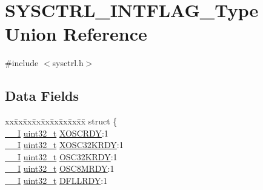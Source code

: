 \hypertarget{union_s_y_s_c_t_r_l___i_n_t_f_l_a_g___type}{}\section{S\+Y\+S\+C\+T\+R\+L\+\_\+\+I\+N\+T\+F\+L\+A\+G\+\_\+\+Type Union Reference}
\label{union_s_y_s_c_t_r_l___i_n_t_f_l_a_g___type}


{\ttfamily \#include $<$sysctrl.\+h$>$}

\subsection*{Data Fields}
\begin{DoxyCompactItemize}
\item 
\begin{tabbing}
xx\=xx\=xx\=xx\=xx\=xx\=xx\=xx\=xx\=\kill
struct \{\\
\>\mbox{\hyperlink{core__cm0plus_8h_af63697ed9952cc71e1225efe205f6cd3}{\_\_I}} \mbox{\hyperlink{union_s_y_s_c_t_r_l___i_n_t_f_l_a_g___type_a7c2ec0f7b3f1314bdede58b182af397c}{uint32\_t}} \mbox{\hyperlink{union_s_y_s_c_t_r_l___i_n_t_f_l_a_g___type_a9aa97074ed30a2f0ac649d8528d5d678}{XOSCRDY}}:1\\
\>\mbox{\hyperlink{core__cm0plus_8h_af63697ed9952cc71e1225efe205f6cd3}{\_\_I}} \mbox{\hyperlink{union_s_y_s_c_t_r_l___i_n_t_f_l_a_g___type_a7c2ec0f7b3f1314bdede58b182af397c}{uint32\_t}} \mbox{\hyperlink{union_s_y_s_c_t_r_l___i_n_t_f_l_a_g___type_ae11e5e790a7928746b574e5f9538107f}{XOSC32KRDY}}:1\\
\>\mbox{\hyperlink{core__cm0plus_8h_af63697ed9952cc71e1225efe205f6cd3}{\_\_I}} \mbox{\hyperlink{union_s_y_s_c_t_r_l___i_n_t_f_l_a_g___type_a7c2ec0f7b3f1314bdede58b182af397c}{uint32\_t}} \mbox{\hyperlink{union_s_y_s_c_t_r_l___i_n_t_f_l_a_g___type_a2b786573344459935e68c9aeb80142eb}{OSC32KRDY}}:1\\
\>\mbox{\hyperlink{core__cm0plus_8h_af63697ed9952cc71e1225efe205f6cd3}{\_\_I}} \mbox{\hyperlink{union_s_y_s_c_t_r_l___i_n_t_f_l_a_g___type_a7c2ec0f7b3f1314bdede58b182af397c}{uint32\_t}} \mbox{\hyperlink{union_s_y_s_c_t_r_l___i_n_t_f_l_a_g___type_a74f2eac2773310fa93ba3ccc030032a6}{OSC8MRDY}}:1\\
\>\mbox{\hyperlink{core__cm0plus_8h_af63697ed9952cc71e1225efe205f6cd3}{\_\_I}} \mbox{\hyperlink{union_s_y_s_c_t_r_l___i_n_t_f_l_a_g___type_a7c2ec0f7b3f1314bdede58b182af397c}{uint32\_t}} \mbox{\hyperlink{union_s_y_s_c_t_r_l___i_n_t_f_l_a_g___type_a7eddfd8939ae59148ebd865d8cb8defe}{DFLLRDY}}:1\\

\end{tabbing}
\end{DoxyCompactItemize}
